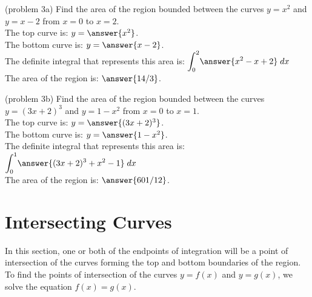 \documentclass[handout]{ximera}
\begin{document}
\begin{problem}(problem 3a)
Find the area of the region bounded between the curves $y = x^2$ and $y = x - 2$ from $x = 0$ to $x = 2$.\\
The top curve is: $y = \answer{x^2}$.\\
The bottom curve is: $y = \answer{x - 2}$.\\
The definite integral that represents this area is: $\displaystyle{\int_0^2} \answer{x^2 - x + 2} \; dx$\\
The area of the region is: $\answer{14/3}$.
\end{problem}



\begin{problem}(problem 3b)
Find the area of the region bounded between the curves $y = (3x+2)^3$ and $y = 1 - x^2$ from $x = 0$ to $x = 1$.\\
The top curve is: $y = \answer{(3x+2)^3}$.\\
The bottom curve is: $y = \answer{1-x^2}$.\\
The definite integral that represents this area is: $\displaystyle{\int_0^1 } \answer{(3x+2)^3  + x^2 - 1} \; dx$\\
The area of the region is: $\answer{601/12}$.
\end{problem}

\section{Intersecting Curves}
In this section, one or both of the endpoints of integration will be a point of intersection of the curves forming the top and bottom 
boundaries of the region.  To find the points of intersection of the curves $y = f(x)$ and $y = g(x)$, we solve the equation $f(x) = g(x)$.
\end{document}
